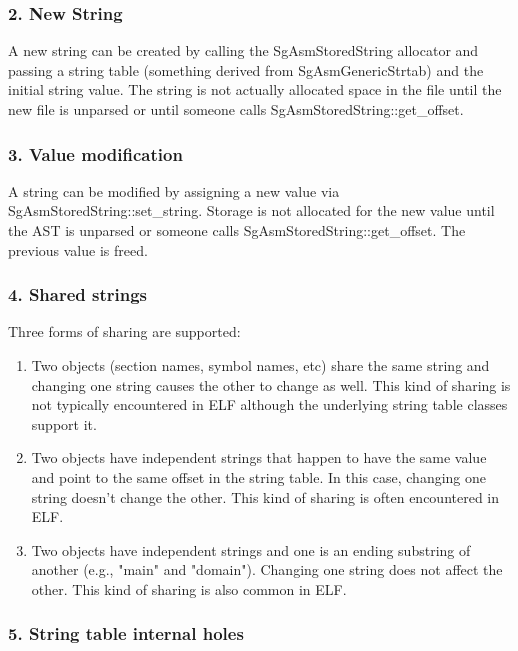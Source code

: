 \subsubsection{2. New String}

   A new string can be created by calling the SgAsmStoredString allocator and passing a string table (something derived from
   SgAsmGenericStrtab) and the initial string value.  The string is not actually allocated space in the file until the new file
   is unparsed or until someone calls SgAsmStoredString::get\_offset.

\subsubsection{3. Value modification}

   A string can be modified by assigning a new value via SgAsmStoredString::set\_string. Storage is not allocated for the new
   value until the AST is unparsed or someone calls SgAsmStoredString::get\_offset.  The previous value is freed.

\subsubsection{4. Shared strings}

   Three forms of sharing are supported:

\begin{enumerate}
   \item Two objects (section names, symbol names, etc) share the same string and changing one string causes the other to change
      as well. This kind of sharing is not typically encountered in ELF although the underlying string table classes support
      it.

   \item Two objects have independent strings that happen to have the same value and point to the same offset in the string
      table. In this case, changing one string doesn't change the other. This kind of sharing is often encountered in ELF.

   \item Two objects have independent strings and one is an ending substring of another (e.g., "main" and "domain"). Changing one
      string does not affect the other. This kind of sharing is also common in ELF.
\end{enumerate}

\subsubsection{5. String table internal holes}

